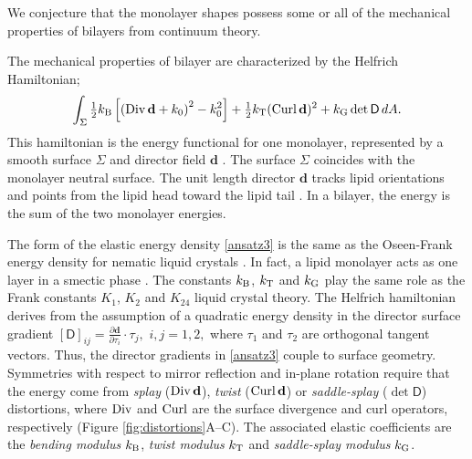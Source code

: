 We conjecture that the monolayer shapes 
possess some or all of the mechanical properties of bilayers from continuum theory. 

The mechanical properties of bilayer are characterized by the Helfrich Hamiltonian;
\begin{equation}
\label{ansatz3}
\begin{aligned}
\int_{\Sigma} 
 \tfrac{1}{2}k_{\mathrm{B}}\left[ \left( \operatorname{Div} \mathbf{d} + k_0\right)^2 - k_0^2\right] 
+ \tfrac{1}{2}k_{\mathrm{T}} (\operatorname{Curl} \mathbf{d})^2 + k_{\mathrm{G}}  \det \mathsf{D} \,dA.
\end{aligned}
\end{equation}
This hamiltonian is the energy functional for one monolayer,
represented by a smooth surface $\Sigma$ and director field $\mathbf{d}$
 \cite{Helfrich73, PhysRevLett.113.248102, Hamm2000}.
The surface $\Sigma$ coincides with the monolayer neutral surface. The 
unit length director $\mathbf{d}$ tracks lipid orientations  
and points from the lipid head toward the lipid tail \cite{doi:10.1021/jp075641w,KLAUDA20083074}.
In a bilayer, the energy is the sum of the two monolayer energies. 

The form of the elastic energy density \eqref{ansatz3} is the same as
the Oseen-Frank energy density for nematic liquid crystals \cite{ANDRIENKO2018520,Tran7106}.  In fact,  
a lipid monolayer acts as one layer in a smectic  phase \cite{REYESMATEO1995978,Rangamani20140463,PhysRevLett.113.248102}. 
The constants $k_{\mathrm{B}}$, $k_{\mathrm{T}}$  and $k_{\mathrm{G}}$ play the same role as the Frank constants $K_1$, $K_2$ and $K_{24}$
liquid crystal theory. 
The Helfrich hamiltonian derives from the assumption of a quadratic energy density
in the director surface gradient 
$[\mathsf{D}]_{ij} = \frac{\partial \mathbf{d} }{\partial \tau_i} \cdot \tau_j,$ $i,j = 1,2,$ 
where $\tau_1$ and $\tau_2$ are orthogonal tangent vectors. Thus, the 
director gradients in \eqref{ansatz3} couple to surface geometry. 
Symmetries  with respect to mirror reflection and in-plane rotation 
require that the energy come from
\emph{splay} ($\operatorname{Div} \mathbf{d}$), 
\emph{twist} ($\operatorname{Curl} \mathbf{d}$)
or \emph{saddle-splay} ($\det \mathsf{D}$) distortions,
where $\operatorname{Div}$ and $\operatorname{Curl}$ are the surface divergence  and curl  operators, respectively (Figure \ref{fig:distortions}A--C).
The associated elastic coefficients  are the \emph{bending modulus} $k_{\mathrm{B}}$,  \emph{twist modulus} $k_{\mathrm{T}}$ 
and \emph{saddle-splay modulus} $k_{\mathrm{G}}$.

